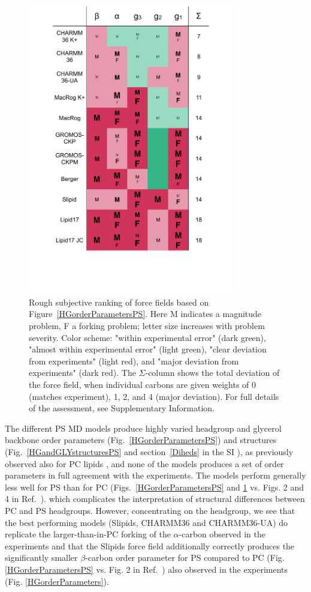 \documentclass[aps,prl,superscriptaddress,twocolumn]{revtex4}
\begin{document}
\begin{figure}[]
  \centering
  \includegraphics[width=9.0cm]{../Figs/comparisonTablePS.pdf}
  \caption{\label{comparisonTablePS}
    Rough subjective ranking of force fields based on Figure~\ref{HGorderParametersPS}.
    Here {\textsf{\small M}} indicates a magnitude problem, {\textsf{\small F}} a forking problem; letter size increases with problem severity. Color scheme: "within experimental error" (dark green), "almost within experimental error" (light green), "clear deviation from experiments" (light red), and "major deviation from experiments" (dark red). The $\Sigma$-column shows the total deviation of the force field, when individual carbons are given weights of 0 (matches experiment), 1, 2, and 4 (major deviation). For full details of the assessment, see Supplementary Information.
  }
\end{figure}

The different PS MD models produce highly varied  headgroup and glycerol backbone order parameters (Fig.~\ref{HGorderParametersPS})
and structures (Fig.~\ref{HGandGLYstructuresPS} and section~\ref{Diheds} in the SI ),
as previously observed also for PC lipids \cite{botan15}, and none of the models produces a set of order parameters in full agreement with the experiments.
The models perform generally less well for PS than for PC
(Figs.~\ref{HGorderParametersPS} and \ref{comparisonTablePS} vs. Figs. 2 and 4 in Ref.~\cite{botan15}).
which complicates the interpretation of structural differences between PC and PS headgroups. However, concentrating on the headgroup, we see that the best performing models (Slipids, CHARMM36 and CHARMM36-UA) do replicate the larger-than-in-PC
forking of the $\alpha$-carbon observed in the experiments and that the Slipids force field additionally correctly produces the significantly
smaller $\beta$-carbon order parameter for PS compared to PC (Fig. \ref{HGorderParametersPS} vs. Fig. 2 in Ref.~)
also observed in the experiments (Fig. \ref{HGorderParameters}).
\end{document}
